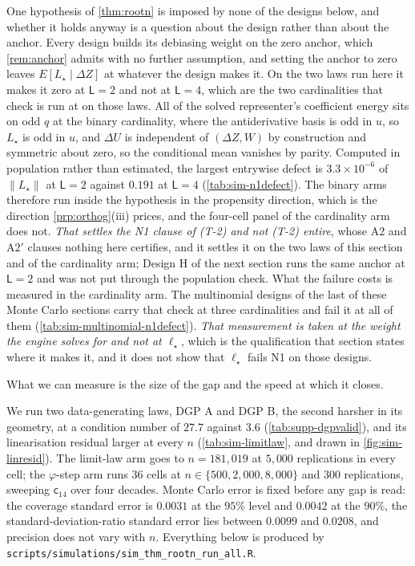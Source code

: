 \documentclass[
  12pt]{article}
\newcommand{\1}[1]{\mathds{1}\left[#1\right]}
\theoremstyle{plain}
\theoremstyle{definition}
\theoremstyle{definition}
\theoremstyle{remark}
\begin{document}
One hypothesis of \cref{thm:rootn} is imposed by none of the designs below, and
whether it holds anyway is a question about the design rather than about the
anchor. Every design builds its debiasing weight on the zero anchor, which
\cref{rem:anchor} admits with no further assumption, and setting the anchor to zero leaves $E[L_\star\mid\Delta Z]$ at
whatever the design makes it. On the two laws run here it makes it zero at
$\mathsf L=2$ and not at $\mathsf L=4$, which are the two cardinalities that
check is run at on those laws. All of the solved representer's
coefficient energy sits on odd $q$ at the binary cardinality, where the
antiderivative basis is odd in $u$, so $L_\star$ is odd in $u$, and $\Delta U$ is
independent of $(\Delta Z,W)$ by construction and symmetric about zero, so the
conditional mean vanishes by parity. Computed in population rather than
estimated, the largest entrywise defect is $3.3\times10^{-6}$ of $\|L_\star\|$ at
$\mathsf L=2$ against $0.191$ at $\mathsf L=4$ (\cref{tab:sim-n1defect}). The
binary arms therefore run inside the hypothesis in the propensity direction,
which is the direction \cref{prp:orthog}(iii) prices, and the four-cell panel of
the cardinality arm does not. \emph{That settles the N1 clause of \textup{(T-2)} and
not \textup{(T-2)} entire}, whose A2 and A$2'$ clauses nothing here certifies,
and it settles it on the two laws of this section and of the
cardinality arm; Design H of the next section runs the same anchor at $\mathsf L=2$ and was not
put through the population check. What the failure costs is measured in the
cardinality arm. The multinomial designs of the last of these Monte Carlo sections carry that
check at three cardinalities and fail it at all of them
(\cref{tab:sim-multinomial-n1defect}). \emph{That measurement is taken at the weight
the engine solves for and not at $\ell_\star$}, which is the qualification that
section states where it makes it, and it does not show that
$\ell_\star$ fails N1 on those designs.

What we can measure is the size of the gap and the speed at which it closes.

We run two data-generating laws, DGP A and DGP B, the second harsher in its
geometry, at a condition number of $27.7$ against $3.6$ (\cref{tab:supp-dgpvalid}), and its linearisation residual larger at every $n$
(\cref{tab:sim-limitlaw}, and drawn in \cref{fig:sim-linresid}). The limit-law arm
goes to $n=181{,}019$ at $5{,}000$ replications in every cell; the
$\varphi$-step arm runs $36$ cells at $n\in\{500,2{,}000,8{,}000\}$ and $300$
replications, sweeping $\mathsf c_{14}$ over four decades. Monte Carlo error is
fixed before any gap is read: the coverage standard error is $0.0031$ at the
$95\%$ level and $0.0042$ at the $90\%$, the standard-deviation-ratio standard
error lies between $0.0099$ and $0.0208$, and precision does not vary with $n$.
Everything below is produced by \texttt{scripts/simulations/sim\_thm\_rootn\_run\_all.R}.
\end{document}
